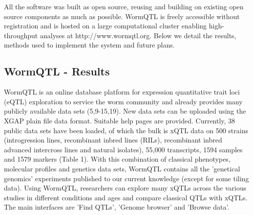 \documentclass[8pt, twoside, a5paper]{report}
\begin{document}
All the software was built as open source, reusing and building on existing open source components as much as possible. WormQTL 
is freely accessible without registration and is hosted on a large computational cluster enabling high-throughput analyses at 
http://www.wormqtl.org. Below we detail the results, methods used to implement the system and future plans.

\subsection{WormQTL - Results}
WormQTL is an online database platform for expression quantitative trait loci (eQTL) exploration to service the worm community and 
already provides many publicly available data sets (5,9-15,19). New data sets can be uploaded using the XGAP plain file data format. 
Suitable help pages are provided. Currently, 38 public data sets have been loaded, of which the bulk is xQTL data on 500 strains 
(introgression lines, recombinant inbred lines (RILs), recombinant inbred advanced intercross lines and natural isolates), 55,000 
transcripts, 1594 samples and 1579 markers (Table 1). With this combination of classical phenotypes, molecular profiles and genetics 
data sets, WormQTL contains all the 'genetical genomics' experiments published to our current knowledge (except for some tiling data). 
Using WormQTL, researchers can explore many xQTLs across the various studies in different conditions and ages and compare classical 
QTLs with xQTLs. The main interfaces are 'Find QTLs', 'Genome browser' and 'Browse data'.
\end{document}
